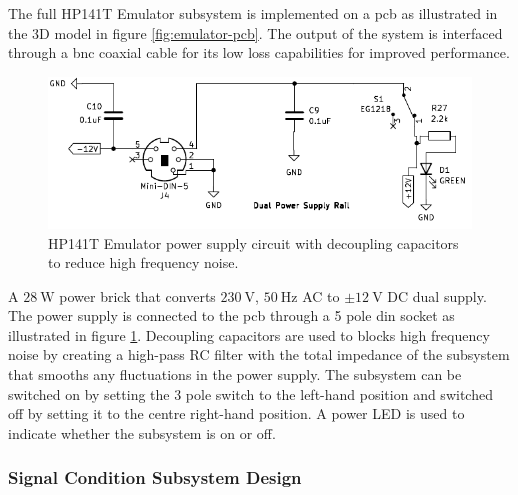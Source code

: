 \documentclass[class=report,11pt,crop=false]{standalone}
\begin{document}
	The full HP141T Emulator subsystem is implemented on a \acrshort{pcb} as illustrated in the 3D model in figure \ref{fig:emulator-pcb}. The output of the system is interfaced through a \acrshort{bnc} coaxial cable for its low loss capabilities for improved performance. 
	
	\begin{figure}
		\centering
		\includegraphics[width=0.55\linewidth]{Figures/Methodology/emulator-power-supply}
		\caption{HP141T Emulator power supply circuit with decoupling capacitors to reduce high frequency noise.}
		\label{fig:emulator-power-ct}
	\end{figure}
	
	A $\SI{28}{\watt}$ power brick that converts $\SI{230}{\volt}$, $\SI{50}{\hertz}$ AC to $\pm\SI{12}{\volt}$ DC dual supply. The power supply is connected to the \acrshort{pcb} through a 5 pole din socket as illustrated in figure \ref{fig:emulator-power-ct}. Decoupling capacitors are used to blocks high frequency noise by creating a high-pass RC filter with the total impedance of the subsystem that smooths any fluctuations in the power supply. The subsystem can be switched on by setting the 3 pole switch to the left-hand position and switched off by setting it to the centre right-hand position. A power LED is used to indicate whether the subsystem is on or off. 
	
	\subsubsection{Signal Condition Subsystem Design}
	
	
	\ifstandalone
	
	\printnoidxglossary[type=\acronymtype,nonumberlist]
	\fi
\end{document}
